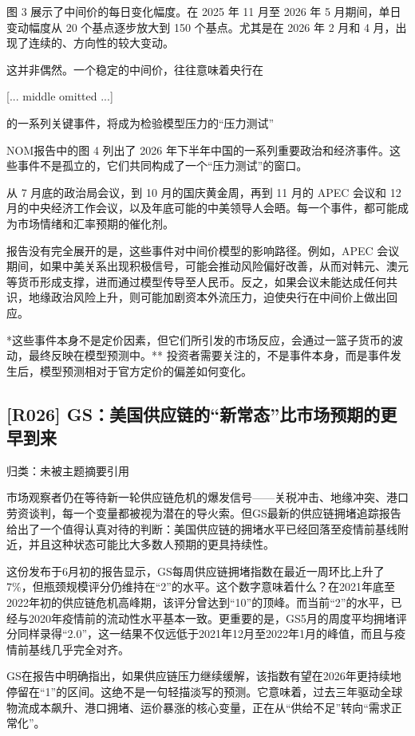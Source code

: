 \documentclass[11pt]{ctexart}
\begin{document}
图 3 展示了中间价的每日变化幅度。在 2025 年 11 月至 2026 年 5 月期间，单日变动幅度从 20 个基点逐步放大到 150 个基点。尤其是在 2026 年 2 月和 4 月，出现了连续的、方向性的较大变动。

这并非偶然。一个稳定的中间价，往往意味着央行在

[... middle omitted ...]

的一系列关键事件，将成为检验模型压力的“压力测试”

NOM报告中的图 4 列出了 2026 年下半年中国的一系列重要政治和经济事件。这些事件不是孤立的，它们共同构成了一个“压力测试”的窗口。

从 7 月底的政治局会议，到 10 月的国庆黄金周，再到 11 月的 APEC 会议和 12 月的中央经济工作会议，以及年底可能的中美领导人会晤。每一个事件，都可能成为市场情绪和汇率预期的催化剂。

报告没有完全展开的是，这些事件对中间价模型的影响路径。例如，APEC 会议期间，如果中美关系出现积极信号，可能会推动风险偏好改善，从而对韩元、澳元等货币形成支撑，进而通过模型传导至人民币。反之，如果会议未能达成任何共识，地缘政治风险上升，则可能加剧资本外流压力，迫使央行在中间价上做出回应。

*这些事件本身不是定价因素，但它们所引发的市场反应，会通过一篮子货币的波动，最终反映在模型预测中。** 投资者需要关注的，不是事件本身，而是事件发生后，模型预测相对于官方定价的偏差如何变化。

\subsection{[R026] GS：美国供应链的“新常态”比市场预期的更早到来}
{\small\color{refgray}归类：未被主题摘要引用}

市场观察者仍在等待新一轮供应链危机的爆发信号——关税冲击、地缘冲突、港口劳资谈判，每一个变量都被视为潜在的导火索。但GS最新的供应链拥堵追踪报告给出了一个值得认真对待的判断：美国供应链的拥堵水平已经回落至疫情前基线附近，并且这种状态可能比大多数人预期的更具持续性。

这份发布于6月初的报告显示，GS每周供应链拥堵指数在最近一周环比上升了7\%，但瓶颈规模评分仍维持在“2”的水平。这个数字意味着什么？在2021年底至2022年初的供应链危机高峰期，该评分曾达到“10”的顶峰。而当前“2”的水平，已经与2020年疫情前的流动性水平基本一致。更重要的是，GS5月的周度平均拥堵评分同样录得“2.0”，这一结果不仅远低于2021年12月至2022年1月的峰值，而且与疫情前基线几乎完全对齐。

GS在报告中明确指出，如果供应链压力继续缓解，该指数有望在2026年更持续地停留在“1”的区间。这绝不是一句轻描淡写的预测。它意味着，过去三年驱动全球物流成本飙升、港口拥堵、运价暴涨的核心变量，正在从“供给不足”转向“需求正常化”。
\end{document}
